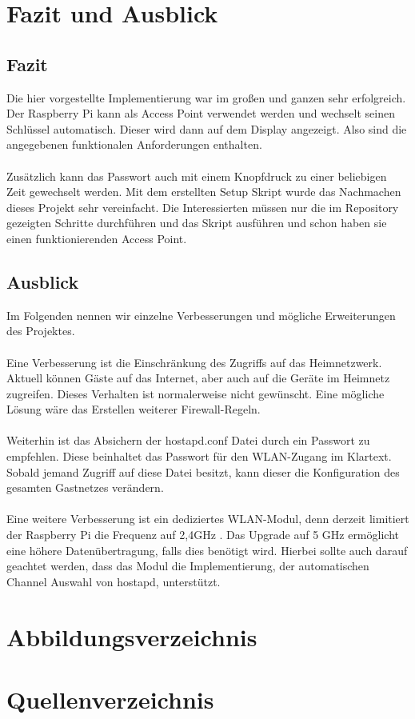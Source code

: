 \documentclass[a4paper,11pt,singlespacing]{article}
\begin{document}
    \section{Fazit und Ausblick}
	    \subsection{Fazit}
	    	Die hier vorgestellte Implementierung war im großen und ganzen sehr erfolgreich. Der Raspberry Pi kann als Access Point verwendet werden und wechselt seinen Schlüssel automatisch. Dieser wird dann auf dem Display angezeigt. Also sind die angegebenen funktionalen Anforderungen enthalten. \\ \\ Zusätzlich kann das Passwort auch mit einem Knopfdruck zu einer beliebigen Zeit gewechselt werden. Mit dem erstellten Setup Skript wurde das Nachmachen dieses Projekt sehr vereinfacht. Die Interessierten müssen nur die im Repository \cite{Quote_github_repo} gezeigten Schritte durchführen und das Skript ausführen und schon haben sie einen funktionierenden Access Point. \\
	    \subsection{Ausblick}
	    	Im Folgenden nennen wir einzelne Verbesserungen und mögliche Erweiterungen des Projektes. \\ \\
	    	Eine Verbesserung ist die Einschränkung des Zugriffs auf das Heimnetzwerk. Aktuell können Gäste auf das Internet, aber auch auf die Geräte im Heimnetz zugreifen. Dieses Verhalten ist normalerweise nicht gewünscht. Eine mögliche Lösung wäre das Erstellen weiterer Firewall-Regeln. \\ \\
	    	Weiterhin ist das Absichern der hostapd.conf Datei durch ein Passwort zu empfehlen. Diese beinhaltet das Passwort für den WLAN-Zugang im Klartext. Sobald jemand Zugriff auf diese Datei besitzt, kann dieser die Konfiguration des gesamten Gastnetzes verändern. \\ \\
	    	Eine weitere Verbesserung ist ein dediziertes WLAN-Modul, denn derzeit limitiert der Raspberry Pi die Frequenz auf 2,4GHz \cite{Quote_Raspberrypi3b}. Das Upgrade auf 5 GHz ermöglicht eine höhere Datenübertragung, falls dies benötigt wird. Hierbei sollte auch darauf geachtet werden, dass das Modul die Implementierung, der automatischen Channel Auswahl von hostapd, unterstützt.
    
    
   	\pagebreak
   	\section{Abbildungsverzeichnis}
   	\listoffigures
   	\section{Quellenverzeichnis}
    
    
    	
\clearpage
\end{document}
